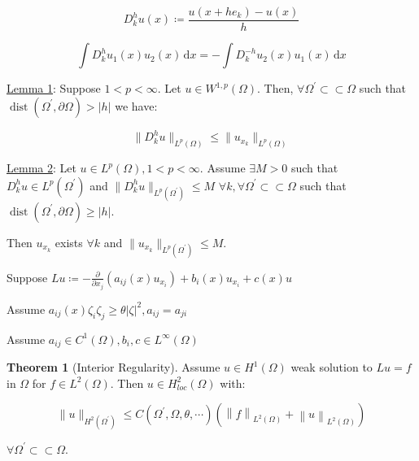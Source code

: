 \documentclass{article}
\theoremstyle{definition}
\newtheorem{theorem}{Theorem}
\begin{document}
\[
    D^h_k u(x) \coloneqq \frac{u(x+he_k)-u(x)}{h}
\]

\[
    \int D_k^h u_1(x) u_2(x) \, \mathrm{d}x = - \int D_k^{-h} u_2(x) u_1(x) \, \mathrm{d}x 
\]

\underline{Lemma 1}: Suppose \(1<p<\infty\). Let \(u\in W^{1,p}(\Omega)\). Then, \(\forall \Omega^{\prime} \subset \subset \Omega\) such that \(\operatorname{dist} (\Omega ^{\prime} , \partial \Omega) > \vert h \vert \) we have:

\[
    \lVert D_k^h u \rVert _{L^p(\Omega)} \leq \lVert u_{x_k} \rVert _{L^p(\Omega)}
\]

\underline{Lemma 2}: Let \(u \in L^p(\Omega), 1 < p < \infty\). Assume \(\exists M > 0\) such that \(D_k^h u \in L^p(\Omega^{\prime} )\) and \(\lVert D^h_k u \rVert _{L^p(\Omega ^{\prime} )} \leq M\)  \(\forall k, \forall \Omega ^{\prime} \subset \subset \Omega\) such that \(\operatorname{dist} (\Omega ^{\prime} , \partial \Omega ) \geq \vert h \vert \).

Then \(u_{x_k}\) exists \(\forall k\) and \(\lVert u_{x_k} \rVert _{L^p(\Omega^{\prime} )}\leq M\).

Suppose \(Lu \coloneqq - \frac{\partial}{\partial x_j} (a_{ij}(x) u_{x_i}) + b_i(x)u_{x_i} + c(x)u\) 

Assume \(a_{ij}(x)\zeta_i \zeta_j \geq \theta \vert \zeta \vert ^2, a_{ij} = a_{ji}\) 

Assume \(a_{ij}\in C^1(\Omega), b_{i}, c \in L^{\infty} (\Omega)\) 

\begin{theorem}[Interior Regularity]
    Assume \(u\in H^{1} (\Omega)\) weak solution to \(Lu = f\) in \(\Omega\) for \(f\in L^2(\Omega)\). Then \(u\in H^2_{loc} (\Omega) \) with:

    \[
        \lVert u \rVert _{H^2(\Omega^{\prime})}\leq C(\Omega ^{\prime} , \Omega , \theta , \cdots) \left( \left\lVert f \right\rVert _{L^2(\Omega)} + \left\lVert u \right\rVert _{L^2(\Omega)} \right) 
    \]

    \(\forall \Omega ^{\prime} \subset \subset \Omega\).
\end{theorem}
\end{document}

